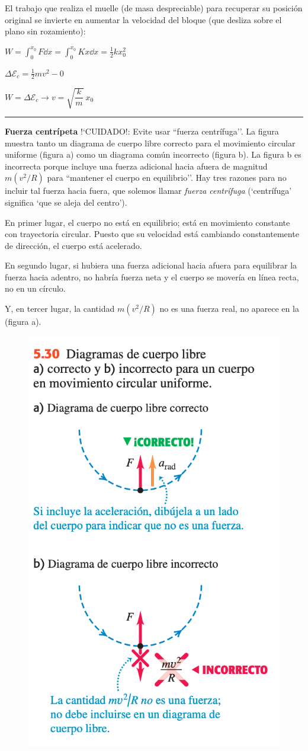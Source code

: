 El trabajo que realiza el muelle (de masa despreciable) para recuperar su posición original se invierte en aumentar la velocidad del bloque (que desliza sobre el plano sin rozamiento):

$W=\displaystyle \int_0^{x_0} F \dd x=\int_0^{x_0} K x \dd x= \frac 1 2 k x_0^2$

$\Delta \mathcal E_c=\frac 1 2 m v^2 - 0$

$W=\Delta \mathcal E_c \to v=\displaystyle \sqrt{\dfrac k m }\ x_0$


\rule{150 pt}{0.4 pt}

\begin{multicols}{2}
\textbf{Fuerza centrípeta}
\small{!`CUIDADO!: Evite usar ``fuerza centrífuga’’. La figura muestra tanto un diagrama de cuerpo libre correcto para el movimiento circular uniforme (figura a) como un diagrama común incorrecto (figura b). La figura b es incorrecta porque incluye una fuerza adicional hacia afuera de magnitud $m(v^2/R)$ para ``mantener el cuerpo en equilibrio’’. Hay tres razones para no incluir tal fuerza hacia fuera, que solemos llamar \textit{ fuerza centrífuga} (`centrífuga’ significa `que se aleja del centro’). }


\small{En primer lugar, el cuerpo no está en equilibrio; está en movimiento constante con trayectoria circular. Puesto que su velocidad está cambiando constantemente de dirección, el cuerpo está acelerado. }

\small{En segundo lugar, si hubiera una fuerza adicional hacia afuera para equilibrar la fuerza hacia adentro, no habría fuerza neta y el cuerpo se movería en línea recta, no en un círculo.}

\small{Y, en tercer lugar, la cantidad $m(v^2/R)$ no es una fuerza real, no aparece en la (figura a). }

\begin{figure}[H]
	\centering
	\includegraphics[width=.35\textwidth]{imagenes/imagenes03/T03IM41.png}
	\end{figure}
\end{multicols}
